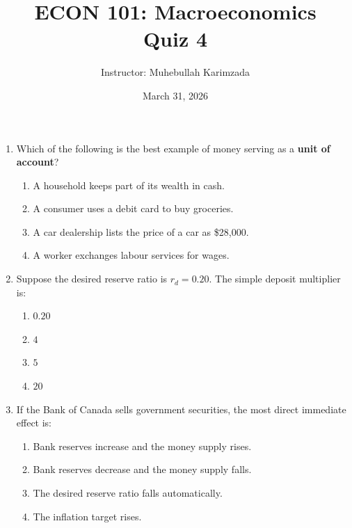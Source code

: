 \documentclass[12pt]{article}
\title{ECON 101: Macroeconomics \\ Quiz 4}
\author{Instructor: Muhebullah Karimzada}
\date{March 31,  2026}
\begin{document}
\maketitle







\begin{enumerate}[label=\textbf{\arabic*.}]

\item Which of the following is the best example of money serving as a \textbf{unit of account}?
\begin{enumerate}[label=(\Alph*)]
    \item A household keeps part of its wealth in cash.
    \item A consumer uses a debit card to buy groceries.
    \item A car dealership lists the price of a car as \$28{,}000.
    \item A worker exchanges labour services for wages.
\end{enumerate}

\item Suppose the desired reserve ratio is \(r_d = 0.20\). The simple deposit multiplier is:
\begin{enumerate}[label=(\Alph*)]
    \item \(0.20\)
    \item \(4\)
    \item \(5\)
    \item \(20\)
\end{enumerate}

\item If the Bank of Canada sells government securities, the most direct immediate effect is:
\begin{enumerate}[label=(\Alph*)]
    \item Bank reserves increase and the money supply rises.
    \item Bank reserves decrease and the money supply falls.
    \item The desired reserve ratio falls automatically.
    \item The inflation target rises.
\end{enumerate}


\end{enumerate}
\end{document}
